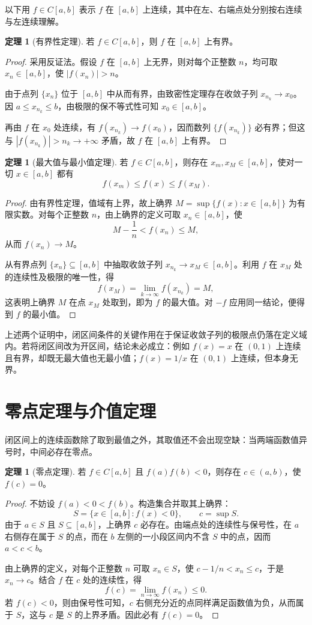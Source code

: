 \documentclass[UTF8,fontset=fandol,a4paper,12pt]{ctexart}
\theoremstyle{definition}
\newtheorem{theorem}[definition]{定理}
\begin{document}
以下用 $f\in C[a,b]$ 表示 $f$ 在 $[a,b]$ 上连续，其中在左、右端点处分别按右连续与左连续理解。

\begin{theorem}[有界性定理]
若 $f\in C[a,b]$，则 $f$ 在 $[a,b]$ 上有界。
\end{theorem}
\begin{proof}
采用反证法。假设 $f$ 在 $[a,b]$ 上无界，则对每个正整数 $n$，均可取 $x_n\in[a,b]$，使 $|f(x_n)|>n$。

由于点列 $\{x_n\}$ 位于 $[a,b]$ 中从而有界，由致密性定理存在收敛子列 $x_{n_k}\to x_0$。因 $a\le x_{n_k}\le b$，由极限的保不等式性可知 $x_0\in[a,b]$。

再由 $f$ 在 $x_0$ 处连续，有 $f(x_{n_k})\to f(x_0)$，因而数列 $\{f(x_{n_k})\}$ 必有界；但这与 $|f(x_{n_k})|>n_k\to+\infty$ 矛盾，故 $f$ 在 $[a,b]$ 上有界。
\end{proof}

\begin{theorem}[最大值与最小值定理]
若 $f\in C[a,b]$，则存在 $x_m,x_M\in[a,b]$，使对一切 $x\in[a,b]$ 都有
\[
 f(x_m)\le f(x)\le f(x_M).
\]
\end{theorem}
\begin{proof}
由有界性定理，值域有上界，故上确界 $M=\sup\{f(x):x\in[a,b]\}$ 为有限实数。对每个正整数 $n$，由上确界的定义可取 $x_n\in[a,b]$，使
\[
 M-\frac1n<f(x_n)\le M,
\]
从而 $f(x_n)\to M$。

从有界点列 $\{x_n\}\subseteq[a,b]$ 中抽取收敛子列 $x_{n_k}\to x_M\in[a,b]$。利用 $f$ 在 $x_M$ 处的连续性及极限的唯一性，得
\[
 f(x_M)=\lim_{k\to\infty}f(x_{n_k})=M,
\]
这表明上确界 $M$ 在点 $x_M$ 处取到，即为 $f$ 的最大值。对 $-f$ 应用同一结论，便得到 $f$ 的最小值。
\end{proof}

上述两个证明中，闭区间条件的关键作用在于保证收敛子列的极限点仍落在定义域内。若将闭区间改为开区间，结论未必成立：例如 $f(x)=x$ 在 $(0,1)$ 上连续且有界，却既无最大值也无最小值；$f(x)=1/x$ 在 $(0,1)$ 上连续，但本身无界。

\section{零点定理与介值定理}
闭区间上的连续函数除了取到最值之外，其取值还不会出现空缺：当两端函数值异号时，中间必存在零点。

\begin{theorem}[零点定理]
若 $f\in C[a,b]$ 且 $f(a)f(b)<0$，则存在 $c\in(a,b)$，使 $f(c)=0$。
\end{theorem}
\begin{proof}
不妨设 $f(a)<0<f(b)$。构造集合并取其上确界：
\[
 S=\{x\in[a,b]:f(x)<0\},\qquad c=\sup S.
\]
由于 $a\in S$ 且 $S\subseteq[a,b]$，上确界 $c$ 必存在。由端点处的连续性与保号性，在 $a$ 右侧存在属于 $S$ 的点，而在 $b$ 左侧的一小段区间内不含 $S$ 中的点，因而 $a<c<b$。

由上确界的定义，对每个正整数 $n$ 可取 $x_n\in S$，使 $c-1/n<x_n\le c$，于是 $x_n\to c$。结合 $f$ 在 $c$ 处的连续性，得
\[
 f(c)=\lim_{n\to\infty}f(x_n)\le0.
\]
若 $f(c)<0$，则由保号性可知，$c$ 右侧充分近的点同样满足函数值为负，从而属于 $S$，这与 $c$ 是 $S$ 的上界矛盾。因此必有 $f(c)=0$。
\end{proof}
\end{document}
